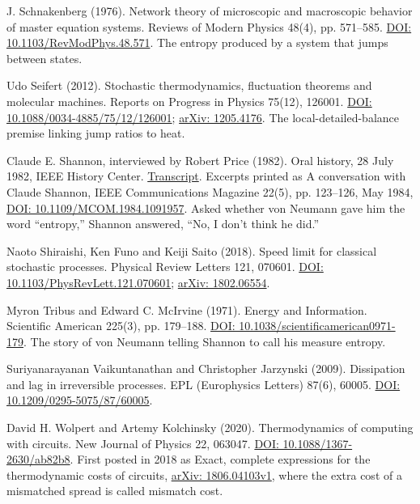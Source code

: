 \documentclass[11pt,twoside]{article}
\theoremstyle{thielethm}
\theoremstyle{thieledef}
\theoremstyle{thieledef}
\theoremstyle{thieledef}
\theoremstyle{thielethm}
\theoremstyle{thieleobs}
\theoremstyle{thielethm}
\begin{document}
\noindent J. Schnakenberg (1976). Network theory of microscopic and macroscopic behavior of master equation systems. Reviews of Modern Physics 48(4), pp. 571--585. \href{https://doi.org/10.1103/RevModPhys.48.571}{DOI: 10.1103/RevModPhys.48.571}. The entropy produced by a system that jumps between states.
\par\medskip

\noindent Udo Seifert (2012). Stochastic thermodynamics, fluctuation theorems and molecular machines. Reports on Progress in Physics 75(12), 126001. \href{https://doi.org/10.1088/0034-4885/75/12/126001}{DOI: 10.1088/0034-4885/75/12/126001}; \href{https://arxiv.org/abs/1205.4176}{arXiv: 1205.4176}. The local-detailed-balance premise linking jump ratios to heat.
\par\medskip

\noindent Claude E. Shannon, interviewed by Robert Price (1982). Oral history, 28 July 1982, IEEE History Center. \href{https://ethw.org/Oral-History:Claude_E._Shannon}{Transcript}. Excerpts printed as A conversation with Claude Shannon, IEEE Communications Magazine 22(5), pp. 123--126, May 1984, \href{https://doi.org/10.1109/MCOM.1984.1091957}{DOI: 10.1109/MCOM.1984.1091957}. Asked whether von Neumann gave him the word ``entropy,'' Shannon answered, ``No, I don't think he did.''
\par\medskip

\noindent Naoto Shiraishi, Ken Funo and Keiji Saito (2018). Speed limit for classical stochastic processes. Physical Review Letters 121, 070601. \href{https://doi.org/10.1103/PhysRevLett.121.070601}{DOI: 10.1103/PhysRevLett.121.070601}; \href{https://arxiv.org/abs/1802.06554}{arXiv: 1802.06554}.
\par\medskip

\noindent Myron Tribus and Edward C. McIrvine (1971). Energy and Information. Scientific American 225(3), pp. 179--188. \href{https://doi.org/10.1038/scientificamerican0971-179}{DOI: 10.1038/scientificamerican0971-179}. The story of von Neumann telling Shannon to call his measure entropy.
\par\medskip

\noindent Suriyanarayanan Vaikuntanathan and Christopher Jarzynski (2009). Dissipation and lag in irreversible processes. EPL (Europhysics Letters) 87(6), 60005. \href{https://doi.org/10.1209/0295-5075/87/60005}{DOI: 10.1209/0295-5075/87/60005}.
\par\medskip

\noindent David H. Wolpert and Artemy Kolchinsky (2020). Thermodynamics of computing with circuits. New Journal of Physics 22, 063047. \href{https://doi.org/10.1088/1367-2630/ab82b8}{DOI: 10.1088/1367-2630/ab82b8}. First posted in 2018 as Exact, complete expressions for the thermodynamic costs of circuits, \href{https://arxiv.org/abs/1806.04103v1}{arXiv: 1806.04103v1}, where the extra cost of a mismatched spread is called mismatch cost.
\par\medskip
\end{document}
